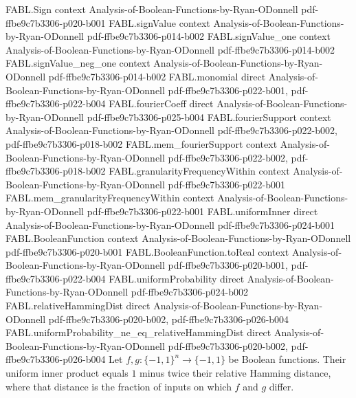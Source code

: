 \begin{theorem}
\label{FABL.uniformInner_eq_one_sub_two_mul_relativeHammingDist}
\leanok
{}
\proofstep
  {FABL.Sign}
  {context}
  {Analysis-of-Boolean-Functions-by-Ryan-ODonnell}
  {pdf-ffbe9c7b3306-p020-b001}
\proofstep
  {FABL.signValue}
  {context}
  {Analysis-of-Boolean-Functions-by-Ryan-ODonnell}
  {pdf-ffbe9c7b3306-p014-b002}
\proofstep
  {FABL.signValue_one}
  {context}
  {Analysis-of-Boolean-Functions-by-Ryan-ODonnell}
  {pdf-ffbe9c7b3306-p014-b002}
\proofstep
  {FABL.signValue_neg_one}
  {context}
  {Analysis-of-Boolean-Functions-by-Ryan-ODonnell}
  {pdf-ffbe9c7b3306-p014-b002}
\proofstep
  {FABL.monomial}
  {direct}
  {Analysis-of-Boolean-Functions-by-Ryan-ODonnell}
  {pdf-ffbe9c7b3306-p022-b001,
    pdf-ffbe9c7b3306-p022-b004}
\proofstep
  {FABL.fourierCoeff}
  {direct}
  {Analysis-of-Boolean-Functions-by-Ryan-ODonnell}
  {pdf-ffbe9c7b3306-p025-b004}
\proofstep
  {FABL.fourierSupport}
  {context}
  {Analysis-of-Boolean-Functions-by-Ryan-ODonnell}
  {pdf-ffbe9c7b3306-p022-b002,
    pdf-ffbe9c7b3306-p018-b002}
\proofstep
  {FABL.mem_fourierSupport}
  {context}
  {Analysis-of-Boolean-Functions-by-Ryan-ODonnell}
  {pdf-ffbe9c7b3306-p022-b002,
    pdf-ffbe9c7b3306-p018-b002}
\proofstep
  {FABL.granularityFrequencyWithin}
  {context}
  {Analysis-of-Boolean-Functions-by-Ryan-ODonnell}
  {pdf-ffbe9c7b3306-p022-b001}
\proofstep
  {FABL.mem_granularityFrequencyWithin}
  {context}
  {Analysis-of-Boolean-Functions-by-Ryan-ODonnell}
  {pdf-ffbe9c7b3306-p022-b001}
\proofstep
  {FABL.uniformInner}
  {direct}
  {Analysis-of-Boolean-Functions-by-Ryan-ODonnell}
  {pdf-ffbe9c7b3306-p024-b001}
\proofstep
  {FABL.BooleanFunction}
  {context}
  {Analysis-of-Boolean-Functions-by-Ryan-ODonnell}
  {pdf-ffbe9c7b3306-p020-b001}
\proofstep
  {FABL.BooleanFunction.toReal}
  {context}
  {Analysis-of-Boolean-Functions-by-Ryan-ODonnell}
  {pdf-ffbe9c7b3306-p020-b001,
    pdf-ffbe9c7b3306-p022-b004}
\proofstep
  {FABL.uniformProbability}
  {direct}
  {Analysis-of-Boolean-Functions-by-Ryan-ODonnell}
  {pdf-ffbe9c7b3306-p024-b002}
\proofstep
  {FABL.relativeHammingDist}
  {direct}
  {Analysis-of-Boolean-Functions-by-Ryan-ODonnell}
  {pdf-ffbe9c7b3306-p020-b002,
    pdf-ffbe9c7b3306-p026-b004}
\proofstep
  {FABL.uniformProbability_ne_eq_relativeHammingDist}
  {direct}
  {Analysis-of-Boolean-Functions-by-Ryan-ODonnell}
  {pdf-ffbe9c7b3306-p020-b002,
    pdf-ffbe9c7b3306-p026-b004}
Let $f,g:\{−1,1\}^n\to\{−1,1\}$ be Boolean functions. Their uniform inner product equals
$1$ minus twice their relative Hamming distance, where that distance is the fraction of
inputs on which $f$ and $g$ differ.
\end{theorem}

